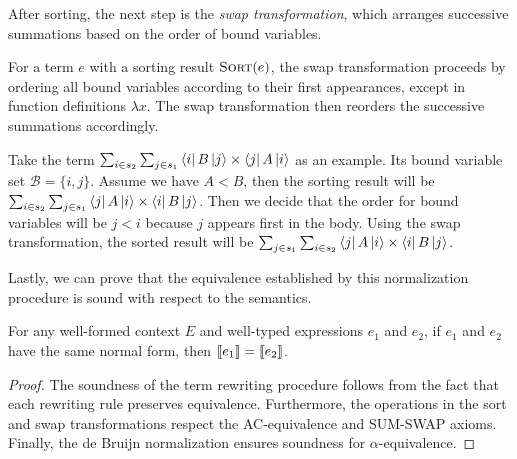 After sorting, the next step is the \textit{swap transformation}, which arranges successive summations based on the order of bound variables.
\begin{definition}
For a term \( e \) with a sorting result \( \textsc{Sort}(e) \), the swap transformation proceeds by ordering all bound variables according to their first appearances, except in function definitions \( \lambda x \). The swap transformation then reorders the successive summations accordingly.
\end{definition}

Take the term $\sum_{i \in s_2} \sum_{j \in s_1} \bra{i} B \ket{j} \times \bra{j} A \ket{i}$ as an example. Its bound variable set $\mathcal{B} = \{i, j\}$. Assume we have $A < B$, then the sorting result will be $\sum_{i \in s_2} \sum_{j \in s_1} \bra{j} A \ket{i} \times \bra{i} B \ket{j}$. Then we decide that the order for bound variables will be $j < i$ because $j$ appears first in the body. Using the swap transformation, the sorted result will be $\sum_{j \in s_1} \sum_{i \in s_2} \bra{j} A \ket{i} \times \bra{i} B \ket{j}$.





Lastly, we can prove that the equivalence established by this normalization procedure is sound with respect to the semantics.

\begin{theorem}[Soundness]
    For any well-formed context \( E \) and well-typed expressions \( e_1 \) and \( e_2 \), if  $e_1$ and $e_2$ have the same normal form, then \( {\llbracket e_1 \rrbracket} = {\llbracket e_2 \rrbracket} \).
\end{theorem}

\begin{proof}
    The soundness of the term rewriting procedure follows from the fact that each rewriting rule preserves equivalence. Furthermore, the operations in the sort and swap transformations respect the AC-equivalence and SUM-SWAP axioms. Finally, the de Bruijn normalization ensures soundness for \( \alpha \)-equivalence.
\end{proof}




